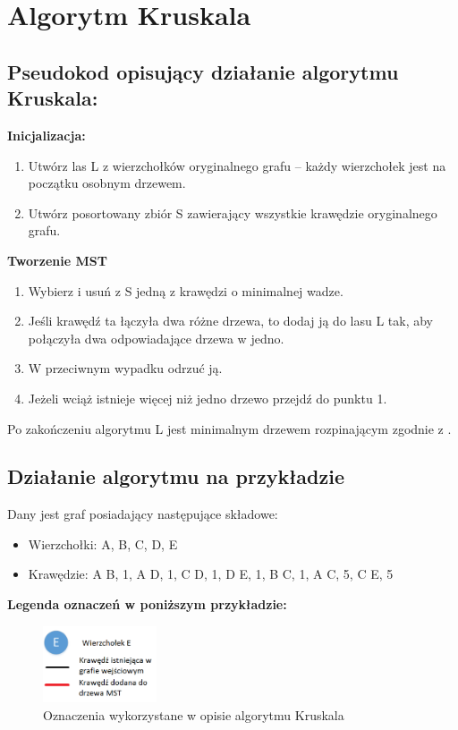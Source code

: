 \section{Algorytm Kruskala}
\subsection{Pseudokod opisujący działanie algorytmu Kruskala:}

\textbf{Inicjalizacja:}
\begin{enumerate}
	\item	Utwórz las L z wierzchołków oryginalnego grafu – każdy wierzchołek jest na początku osobnym drzewem.
	\item Utwórz posortowany zbiór S zawierający wszystkie krawędzie oryginalnego grafu.
\end{enumerate}

\begin{center}
	\textbf{Tworzenie MST}
\end{center}

\begin{enumerate}
\item Wybierz i usuń z S jedną z krawędzi o minimalnej wadze.
\item Jeśli krawędź ta łączyła dwa różne drzewa, to dodaj ją do lasu L tak, aby połączyła dwa odpowiadające drzewa w jedno.
\item W przeciwnym wypadku odrzuć ją.
\item Jeżeli wciąż istnieje więcej niż jedno drzewo przejdź do punktu 1.
\end{enumerate}

Po zakończeniu algorytmu L jest minimalnym drzewem rozpinającym zgodnie z \cite{gis}.

\newpage
\subsection{Działanie algorytmu na przykładzie}
Dany jest graf posiadający następujące składowe:
\begin{itemize}
\item Wierzchołki: {A}, {B}, {C}, {D}, {E}
\item Krawędzie: {A B, 1}, {A D, 1}, {C D, 1}, {D E, 1}, {B C, 1}, {A C, 5}, {C E, 5}
\end{itemize}

\textbf{Legenda oznaczeń w poniższym przykładzie:}\\
\begin{figure}[htb!]
	\centering
	\includegraphics[width=0.3\textwidth]{tex/fig/Picture1}
	\caption{Oznaczenia wykorzystane w opisie algorytmu Kruskala}
	\label{fig: legendK}
\end{figure}


